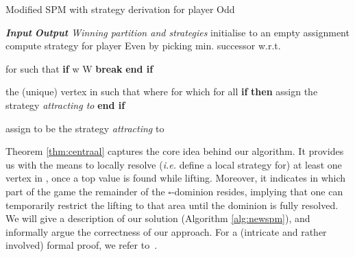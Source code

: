 \documentclass{eptcs}
\newcommand{\odd}{\ensuremath{\square}\xspace}
\newcommand{\ie}{\emph{i.e.}\xspace}
\begin{document}
\begin{algorithm}[h!t]
\caption{Modified SPM with strategy derivation for player Odd}
\label{alg:newspm}
\begin{algorithmic}[1]
\State \emph{\textbf{Input} }
\State \emph{\textbf{Output} Winning partition and strategies }
\State initialise  to an empty assignment
\State 
\State 
\State compute strategy  for player Even by picking min. successor w.r.t. 
\State \Return 

\State

\Procedure{\newspm}{}  


\While{} \label{line:outerwhile}
 \label{line:liftloop_start}
\State  for  such that 
\EndWhile \label{line:liftloop_end}
\State \textbf{if} {w \in W} \textbf{break} \textbf{end if}

\State \label{line:firsttop_v}  the (unique) vertex in  such that 
\State 
\State \label{line:firsttop_strat}  where  for which  for all 
\State 
{}
\State 
\State \textbf{if}  \textbf{then} assign  the strategy \emph{attracting to } \textbf{end if} 
\EndFor \label{line:defsigma_res_end}
\State 
\State \label{line:compute_irr} 
  \State \label{line:rem} 
  \State \label{line:reccall}   
  \State  \label{line:dominion_resolved}
\State 

  \State 
    \If{} 
    assign  to be the strategy  \emph{attracting} to  
    \EndIf
  \EndFor
\State \label{line:smallerW} 
\EndWhile
\EndProcedure
\EndFunction

\end{algorithmic}
\end{algorithm}

\newcommand{\genlift}[3]{\ensuremath{\text{lift}_{#1}(#2,#3)}}
\def\genliftname{\text{lift}_{W}}

Theorem \ref{thm:centraal} captures the core idea behind our algorithm.
It provides us with the means to locally resolve (\ie define a local
strategy for) at least one vertex in , once a top value
is found while lifting. Moreover, it indicates in which part of
the game the remainder of the \odd-dominion resides, implying
that one can temporarily restrict the lifting to that area until
the dominion is fully resolved. 
We will give a description of our solution (Algorithm \ref{alg:newspm}), and
informally argue the correctness of our approach.  For a (intricate and rather involved) formal proof, we
refer to~\cite{GW:14}.
\end{document}
